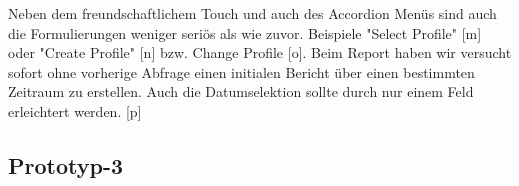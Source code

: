 \documentclass[runningheads,a4paper]{llncs}
\begin{document}
\begin{figure}
\hfill
{}
\hfill
{}
\hfill
{}
\end{figure}

Neben dem freundschaftlichem Touch und auch des Accordion Menüs sind auch die Formulierungen weniger seriös als wie zuvor. Beispiele "Select Profile" [m] oder "Create Profile" [n] bzw. Change Profile [o]. Beim Report haben wir versucht sofort ohne vorherige Abfrage einen initialen Bericht über einen bestimmten Zeitraum zu erstellen. Auch die Datumselektion sollte durch nur einem Feld erleichtert werden. [p]

\clearpage

\subsection{Prototyp-3}
\end{document}
